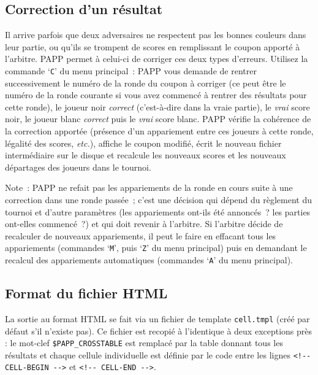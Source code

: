 \documentclass[10pt]{article}
\begin{document}
\subsection{Correction d'un résultat}

Il arrive parfois que deux adversaires ne respectent pas les bonnes 
couleurs dans leur partie, ou qu'ils se trompent de scores en 
remplissant le coupon apporté à l'arbitre.  PAPP permet à 
celui-ci de corriger ces deux types d'erreurs.  Utilisez la commande 
`\verb|C|' du menu principal~: PAPP vous demande de rentrer 
successivement le numéro de la ronde du coupon à corriger (ce peut 
être le numéro de la ronde courante si vous avez commencé à 
rentrer des résultats pour cette ronde), le joueur noir 
\emph{correct} (c'est-à-dire dans la vraie partie), le \emph{vrai} 
score noir, le joueur blanc \emph{correct} puis le \emph{vrai} score 
blanc.  PAPP vérifie la cohérence de la correction apportée 
(présence d'un appariement entre ces joueurs à cette ronde, 
légalité des scores, \emph{etc.}), affiche le coupon modifié, 
écrit le nouveau fichier intermédiaire sur le disque et recalcule 
les nouveaux scores et les nouveaux départages des joueurs dans le 
tournoi.

Note~: PAPP ne refait pas les appariements de la ronde en cours suite 
à une correction dans une ronde passée~; c'est une décision qui 
dépend du règlement du tournoi et d'autre paramètres (les 
appariements ont-ils été annoncés~?  les parties ont-elles 
commencé~?)  et qui doit revenir à l'arbitre.  Si l'arbitre 
décide de recalculer de nouveaux appariements, il peut le faire en 
effacant tous les appariements (commandes `\verb|M|', puis `\verb|Z|' 
du menu principal) puis en demandant le recalcul des appariements 
automatiques (commandes `\verb|A|' du menu principal).

\subsection{Format du fichier HTML}

La sortie au format HTML se fait via un fichier de template \verb|cell.tmpl|
(créé par défaut s'il n'existe pas). Ce fichier est recopié à l'identique
à deux exceptions près : le mot-clef \verb|$PAPP_CROSSTABLE| est remplacé
par la table donnant tous les résultats et chaque cellule individuelle est définie
par le code entre les lignes \verb|<!-- CELL-BEGIN -->| et \verb|<!-- CELL-END -->|.
\end{document}
